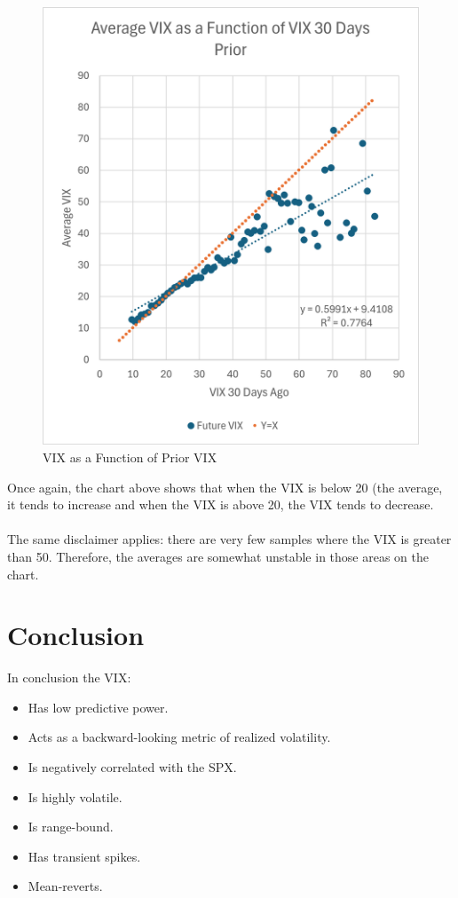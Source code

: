 \documentclass[11pt, oneside]{book}
\begin{document}
\begin{figure}[H]
\centering
\includegraphics[width=\textwidth]{VIXAsAFunctionOfPriorVIX.png}
\caption{VIX as a Function of Prior VIX} \label{Fig-VIXFunctionOfPrevVIX}
\end{figure}
\noindent
Once again, the chart above shows that when the VIX is below 20 (the average, it tends to increase and when the VIX is above 20, the VIX tends to decrease.\\
\\
The same disclaimer applies: there are very few samples where the VIX is greater than 50. Therefore, the averages are somewhat unstable in those areas on the chart.


\section{Conclusion} \label{SigOfVIX-Conclude}
In conclusion the VIX:
\begin{itemize}
    \item Has low predictive power.
    \item Acts as a backward-looking metric of realized volatility.
    \item Is negatively correlated with the SPX.
    \item Is highly volatile.
    \item Is range-bound.
    \item Has transient spikes. 
    \item Mean-reverts.
\end{itemize} 
\end{document}
